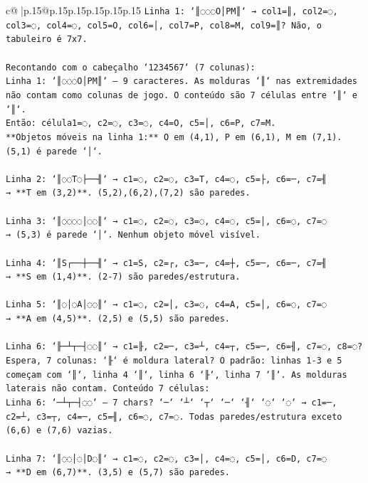 \documentclass{article}
\begin{document}
{\begin{supertabular}{c@{$\;$}|p{.15\linewidth}@{}p{.15\linewidth}p{.15\linewidth}p{.15\linewidth}p{.15\linewidth}p{.15\linewidth}}
{{{\texttt{Linha 1: `║◌◌◌O│PM║` → col1=║, col2=◌, col3=◌, col4=◌, col5=O, col6=│, col7=P, col8=M, col9=║? Não, o tabuleiro é 7x7.} \\
\\ 
\texttt{Recontando com o cabeçalho `1234567` (7 colunas):} \\
\texttt{Linha 1: `║◌◌◌O│PM║` — 9 caracteres. As molduras `║` nas extremidades não contam como colunas de jogo. O conteúdo são 7 células entre `║` e `║`.} \\
\texttt{Então: célula1=◌, c2=◌, c3=◌, c4=O, c5=│, c6=P, c7=M.} \\
\texttt{**Objetos móveis na linha 1:** O em (4,1), P em (6,1), M em (7,1). (5,1) é parede `│`.} \\
\\ 
\texttt{Linha 2: `║◌◌T◌├──╢` → c1=◌, c2=◌, c3=T, c4=◌, c5=├, c6=─, c7=╢} \\
\texttt{→ **T em (3,2)**. (5,2),(6,2),(7,2) são paredes.} \\
\\ 
\texttt{Linha 3: `║◌◌◌◌│◌◌║` → c1=◌, c2=◌, c3=◌, c4=◌, c5=│, c6=◌, c7=◌} \\
\texttt{→ (5,3) é parede `│`. Nenhum objeto móvel visível.} \\
\\ 
\texttt{Linha 4: `║S┌──┼──╢` → c1=S, c2=┌, c3=─, c4=┼, c5=─, c6=─, c7=╢} \\
\texttt{→ **S em (1,4)**. (2{-}7) são paredes/estrutura.} \\
\\ 
\texttt{Linha 5: `║◌│◌A│◌◌║` → c1=◌, c2=│, c3=◌, c4=A, c5=│, c6=◌, c7=◌} \\
\texttt{→ **A em (4,5)**. (2,5) e (5,5) são paredes.} \\
\\ 
\texttt{Linha 6: `╟─┴┬─┤◌◌║` → c1=╟, c2=─, c3=┴, c4=┬, c5=─, c6=╢, c7=◌, c8=◌? Espera, 7 colunas: `╟` é moldura lateral? O padrão: linhas 1{-}3 e 5 começam com `║`, linha 4 `║`, linha 6 `╟`, linha 7 `║`. As molduras laterais não contam. Conteúdo 7 células:} \\
\texttt{Linha 6: `─┴┬─┤◌◌` — 7 chars? `─` `┴` `┬` `─` `╢` `◌` `◌` → c1=─, c2=┴, c3=┬, c4=─, c5=╢, c6=◌, c7=◌. Todas paredes/estrutura exceto (6,6) e (7,6) vazias.} \\
\\ 
\texttt{Linha 7: `║◌◌│◌│D◌║` → c1=◌, c2=◌, c3=│, c4=◌, c5=│, c6=D, c7=◌} \\
\texttt{→ **D em (6,7)**. (3,5) e (5,7) são paredes.} \\
}}}
\end{supertabular}}
\end{document}
